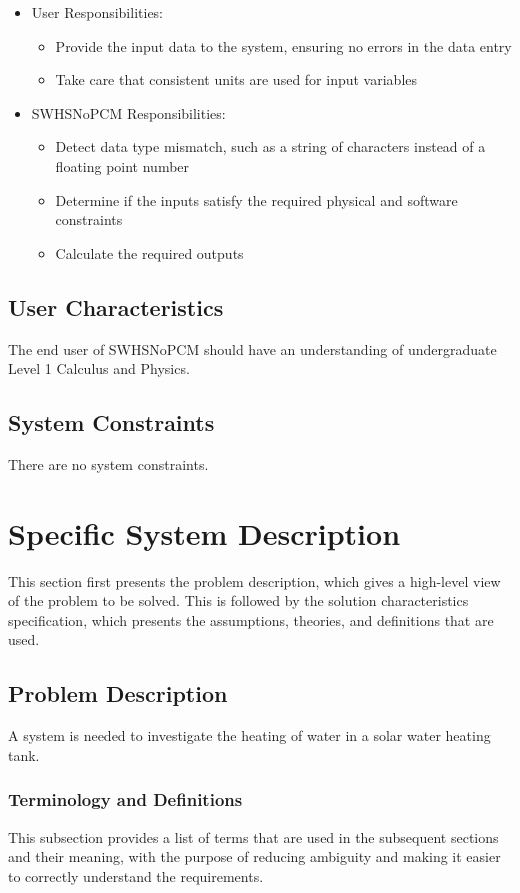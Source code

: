 \documentclass[12pt]{article}
\begin{document}
\begin{itemize}
\item{User Responsibilities:}
\begin{itemize}
\item{Provide the input data to the system, ensuring no errors in the data entry}
\item{Take care that consistent units are used for input variables}
\end{itemize}
\item{SWHSNoPCM Responsibilities:}
\begin{itemize}
\item{Detect data type mismatch, such as a string of characters instead of a floating point number}
\item{Determine if the inputs satisfy the required physical and software constraints}
\item{Calculate the required outputs}
\end{itemize}
\end{itemize}
\subsection{User Characteristics}
\label{Sec:UserChars}
The end user of SWHSNoPCM should have an understanding of undergraduate Level 1 Calculus and Physics.

\subsection{System Constraints}
\label{Sec:SysConstraints}
There are no system constraints.

\section{Specific System Description}
\label{Sec:SpecSystDesc}
This section first presents the problem description, which gives a high-level view of the problem to be solved. This is followed by the solution characteristics specification, which presents the assumptions, theories, and definitions that are used.

\subsection{Problem Description}
\label{Sec:ProbDesc}
A system is needed to investigate the heating of water in a solar water heating tank.

\subsubsection{Terminology and Definitions}
\label{Sec:TermDefs}
This subsection provides a list of terms that are used in the subsequent sections and their meaning, with the purpose of reducing ambiguity and making it easier to correctly understand the requirements.
\end{document}
